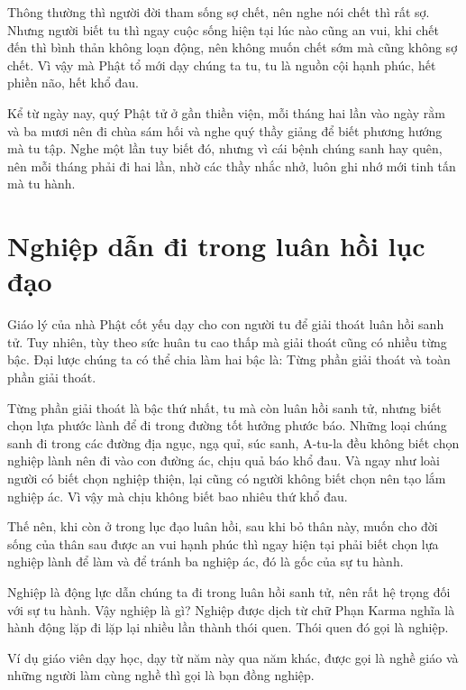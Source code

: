 \documentclass[
  12pt,
  oneside]{book}
\begin{document}
Thông thường thì người đời tham sống sợ chết, nên nghe nói chết thì rất sợ. Nhưng người biết tu thì ngay cuộc sống hiện tại lúc nào cũng an vui, khi chết đến thì bình thản không loạn động, nên không muốn chết sớm mà cũng không sợ chết. Vì vậy mà Phật tổ mới dạy chúng ta tu, tu là nguồn cội hạnh phúc, hết phiền não, hết khổ đau.

Kể từ ngày nay, quý Phật tử ở gần thiền viện, mỗi tháng hai lần vào ngày rằm và ba mươi nên đi chùa sám hối và nghe quý thầy giảng để biết phương hướng mà tu tập. Nghe một lần tuy biết đó, nhưng vì cái bệnh chúng sanh hay quên, nên mỗi tháng phải đi hai lần, nhờ các thầy nhắc nhở, luôn ghi nhớ mới tinh tấn mà tu hành.

\hypertarget{nghiep-dan-di-trong-luan-hoi-luc-dao}{%
\chapter*{Nghiệp dẫn đi trong luân hồi lục đạo}\label{nghiep-dan-di-trong-luan-hoi-luc-dao}}

Giáo lý của nhà Phật cốt yếu dạy cho con người tu để giải thoát luân hồi sanh tử. Tuy nhiên, tùy theo sức huân tu cao thấp mà giải thoát cũng có nhiều từng bậc. Đại lược chúng ta có thể chia làm hai bậc là: Từng phần giải thoát và toàn phần giải thoát.

Từng phần giải thoát là bậc thứ nhất, tu mà còn luân hồi sanh tử, nhưng biết chọn lựa phước lành để đi trong đường tốt hưởng phước báo. Những loại chúng sanh đi trong các đường địa ngục, ngạ quỉ, súc sanh, A-tu-la đều không biết chọn nghiệp lành nên đi vào con đường ác, chịu quả báo khổ đau. Và ngay như loài người có biết chọn nghiệp thiện, lại cũng có người không biết chọn nên tạo lắm nghiệp ác. Vì vậy mà chịu không biết bao nhiêu thứ khổ đau.

Thế nên, khi còn ở trong lục đạo luân hồi, sau khi bỏ thân này, muốn cho đời sống của thân sau được an vui hạnh phúc thì ngay hiện tại phải biết chọn lựa nghiệp lành để làm và để tránh ba nghiệp ác, đó là gốc của sự tu hành.

Nghiệp là động lực dẫn chúng ta đi trong luân hồi sanh tử, nên rất hệ trọng đối với sự tu hành. Vậy nghiệp là gì? Nghiệp được dịch từ chữ Phạn Karma nghĩa là hành động lặp đi lặp lại nhiều lần thành thói quen. Thói quen đó gọi là nghiệp.

Ví dụ giáo viên dạy học, dạy từ năm này qua năm khác, được gọi là nghề giáo và những người làm cùng nghề thì gọi là bạn đồng nghiệp.
\end{document}
